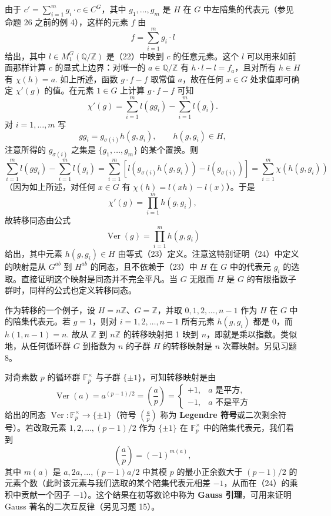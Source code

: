 由于 \(c' = \sum_{i=1}^{m}g_i \cdot c \in C^G\)，其中 \(g_1, \ldots, g_m\) 是 \(H\) 在 \(G\) 中左陪集的代表元（参见命题 26 之前的例 4），这样的元素 \(f\) 由
\[
f = \sum_{i=1}^{m}g_i \cdot l
\]
给出，其中 \(l \in M_1^G(\mathbb{Q}/\mathbb{Z})\) 是（22）中映到 \(c\) 的任意元素。这个 \(l\) 可以用来如前面那样计算 \(c\) 的显式上边界：对唯一的 \(a \in \mathbb{Q}/\mathbb{Z}\) 有 \(h \cdot l-l = f_a\)，且对所有 \(h \in H\) 有 \(\chi(h) = a\). 如上所述，函数 \(g \cdot f-f\) 取常值 \(a\)，故在任何 \(x \in G\) 处求值即可确定 \(\chi'(g)\) 的值。在元素 \(1 \in G\) 上计算 \(g \cdot f-f\) 可知
\[
\chi'(g) = \sum_{i=1}^{m}l(gg_i)-\sum_{i=1}^{m}l(g_i).
\]
对 \(i = 1, \ldots, m\) 写
\[
gg_i = g_{\sigma(i)}h(g, g_i), \qquad h(g, g_i) \in H, \tag{17.23}
\]
注意所得的 \(g_{\sigma(i)}\) 之集是 \(\{g_1, \ldots, g_m\}\) 的某个置换。则
\[
\sum_{i=1}^{m}l(gg_i)-\sum_{i=1}^{m}l(g_i) = \sum_{i=1}^{m}\left[l(g_{\sigma(i)}h(g,g_i))-l(g_{\sigma(i)})\right] = \sum_{i=1}^{m}\chi(h(g, g_i))
\]
（因为如上所述，对任何 \(x \in G\) 有 \(\chi(h) = l(xh)-l(x)\)）。于是
\[
\chi'(g) = \prod_{i=1}^{m}h(g, g_i),
\]
故转移同态由公式
\[
\operatorname{Ver}(g) = \prod_{i=1}^{m}h(g, g_i) \tag{17.24}
\]
给出，其中元素 \(h(g, g_i) \in H\) 由等式（23）定义。注意这特别证明（24）中定义的映射是从 \(G^{ab}\) 到 \(H^{ab}\) 的同态，且不依赖于（23）中 \(H\) 在 \(G\) 中的代表元 \(g_i\) 的选取。直接证明这个映射是同态并不完全平凡。当 \(G\) 无限而 \(H\) 是 \(G\) 的有限指数子群时，同样的公式也定义转移同态。

作为转移的一个例子，设 \(H = n\mathbb{Z}\)、\(G = \mathbb{Z}\)，并取 \(0, 1, 2, \ldots, n-1\) 作为 \(H\) 在 \(G\) 中的陪集代表元。若 \(g = 1\)，则对 \(i = 1, 2, \ldots, n-1\) 所有元素 \(h(g, g_i)\) 都是 0，而 \(h(1, n-1) = n\). 故从 \(\mathbb{Z}\) 到 \(n\mathbb{Z}\) 的转移映射把 1 映到 \(n\)，即就是乘以指数。类似地，从任何循环群 \(G\) 到指数为 \(n\) 的子群 \(H\) 的转移映射是 \(n\) 次幂映射。另见习题 8。

对奇素数 \(p\) 的循环群 \(\mathbb{F}_p^\times\) 与子群 \(\{\pm1\}\)，可知转移映射是由
\[
\operatorname{Ver}(a) = a^{(p-1)/2} = \left(\frac{a}{p}\right) = \begin{cases}+1, & a \text{ 是平方},\\ -1, & a \text{ 不是平方}\end{cases}
\]
给出的同态 \(\operatorname{Ver} : \mathbb{F}_p^\times \to \{\pm1\}\)（符号 \(\left(\frac{a}{p}\right)\) 称为 \textbf{Legendre 符号}或二次剩余符号）。若改取元素 \(1, 2, \ldots, (p-1)/2\) 作为 \(\{\pm1\}\) 在 \(\mathbb{F}_p^\times\) 中的陪集代表元，我们看到
\[
\left(\frac{a}{p}\right) = (-1)^{m(a)},
\]
其中 \(m(a)\) 是 \(a, 2a, \ldots, (p-1)a/2\) 中其模 \(p\) 的最小正余数大于 \((p-1)/2\) 的元素个数（此时该元素与我们选取的某个陪集代表元相差 \(-1\)，从而在（24）的乘积中贡献一个因子 \(-1\)）。这个结果在初等数论中称为 \textbf{Gauss 引理}，可用来证明 Gauss 著名的二次互反律（另见习题 15）。

